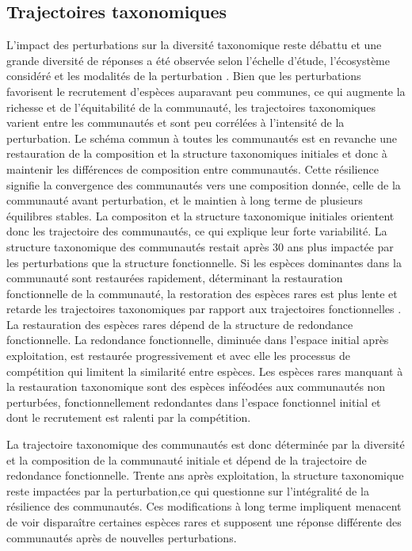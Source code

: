 \documentclass[
  11pt,
  french,
  A4paper,
  extrafontsizes,onecolumn,openright
  ]{memoir}
\begin{document}
\subsection{Trajectoires taxonomiques}\label{trajectoires-taxonomiques}

L'impact des perturbations sur la diversité taxonomique reste débattu et
une grande diversité de réponses a été observée selon l'échelle d'étude,
l'écosystème considéré et les modalités de la perturbation
\autocite{refatrouver}. Bien que les perturbations favorisent le
recrutement d'espèces auparavant peu communes, ce qui augmente la
richesse et de l'équitabilité de la communauté, les trajectoires
taxonomiques varient entre les communautés et sont peu corrélées à
l'intensité de la perturbation. Le schéma commun à toutes les
communautés est en revanche une restauration de la composition et la
structure taxonomiques initiales et donc à maintenir les différences de
composition entre communautés. Cette résilience signifie la convergence
des communautés vers une composition donnée, celle de la communauté
avant perturbation, et le maintien à long terme de plusieurs équilibres
stables. La compositon et la structure taxonomique initiales orientent
donc les trajectoire des communautés, ce qui explique leur forte
variabilité. La structure taxonomique des communautés restait après 30
ans plus impactée par les perturbations que la structure fonctionnelle.
Si les espèces dominantes dans la communauté sont restaurées rapidement,
déterminant la restauration fonctionnelle de la communauté, la
restoration des espèces rares est plus lente et retarde les trajectoires
taxonomiques par rapport aux trajectoires fonctionnelles . La
restauration des espèces rares dépend de la structure de redondance
fonctionnelle. La redondance fonctionnelle, diminuée dans l'espace
initial après exploitation, est restaurée progressivement et avec elle
les processus de compétition qui limitent la similarité entre espèces.
Les espèces rares manquant à la restauration taxonomique sont des
espèces inféodées aux communautés non perturbées, fonctionnellement
redondantes dans l'espace fonctionnel initial et dont le recrutement est
ralenti par la compétition.

La trajectoire taxonomique des communautés est donc déterminée par la
diversité et la composition de la communauté initiale et dépend de la
trajectoire de redondance fonctionnelle. Trente ans après exploitation,
la structure taxonomique reste impactées par la perturbation,ce qui
questionne sur l'intégralité de la résilience des communautés. Ces
modifications à long terme impliquent menacent de voir disparaître
certaines espèces rares et supposent une réponse différente des
communautés après de nouvelles perturbations.
\end{document}
